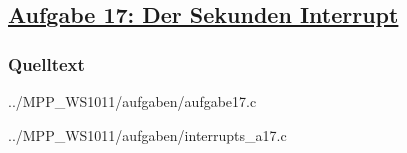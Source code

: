 \subsection*
{\href{http://cst.mi.fu-berlin.de/intern/19606-P-MPP/Aufgaben/040601.html}
{Aufgabe 17: Der Sekunden Interrupt}}

\subsubsection*{Quelltext}

{../MPP_WS1011/aufgaben/aufgabe17.c}


{../MPP_WS1011/aufgaben/interrupts_a17.c}

